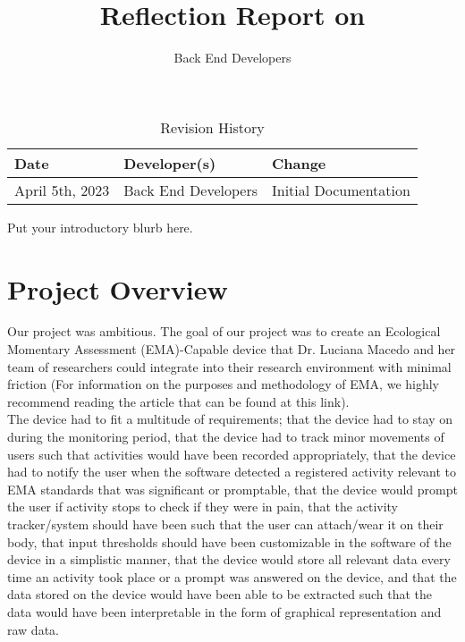 \documentclass{article}
\title{Reflection Report on \progname}
\author{Back End Developers}
\date{}
\begin{document}
\begin{table}[hp]
\caption{Revision History} \label{TblRevisionHistory}
\begin{tabularx}{\textwidth}{llX}
\toprule
\textbf{Date} & \textbf{Developer(s)} & \textbf{Change}\\
\midrule
April 5th, 2023 & Back End Developers & Initial Documentation\\
\bottomrule
\end{tabularx}
\end{table}

\newpage

\maketitle

Put your introductory blurb here.

\section{Project Overview}

Our project was ambitious. The goal of our project was to create an Ecological Momentary Assessment (EMA)-Capable device that Dr. Luciana Macedo and her team of researchers could integrate into their research environment with minimal friction (For information on the purposes and methodology of EMA, we highly recommend reading the article that can be found at this link).\\

The device had to fit a multitude of requirements; that the device had to stay on during the monitoring period, that the device had to track minor movements of users such that activities would have been recorded appropriately, that the device had to notify the user when the software detected a registered activity relevant to EMA standards that was significant or promptable, that the device would prompt the user if activity stops to check if they were in pain, that the activity tracker/system should have been such that the user can attach/wear it on their body, that input thresholds should have been customizable in the software of the device in a simplistic manner, that the device would store all relevant data every time an activity took place or a prompt was answered on the device, and that the data stored on the device would have been able to be extracted such that the data would have been interpretable in the form of graphical representation and raw data.\\
\end{document}
